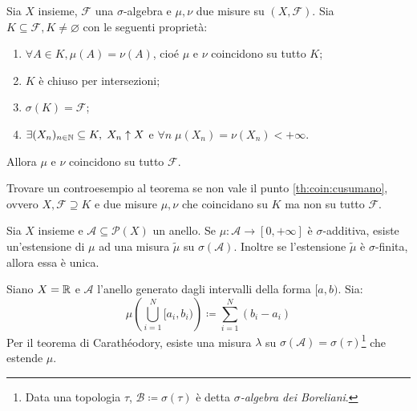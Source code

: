 \begin{thm}
	Sia $X$ insieme, $\mathcal{F}$ una $\sigma$-algebra e $\mu, \nu$ due misure su $(X,\mathcal{F})$. Sia $K\subseteq \mathcal{F}, K\neq \varnothing$ con le seguenti proprietà:
	\begin{enumerate}[label=(\roman*)]
	\item $\forall A \in K, \mu(A)=\nu(A)$, cioé $\mu$ e $\nu$ coincidono su tutto $K$;
	\item $K$ è chiuso per intersezioni;
	\item $\sigma(K)=\mathcal{F}$;
	\item\label{th:coin:cusumano} $\exists (X_n)_{n\in \mathbb{N}}\subseteq K, \; X_n \uparrow X$ e $\forall n\; \mu(X_n)=\nu(X_n)<+\infty$.
	\end{enumerate}
Allora $\mu$ e $\nu$ coincidono su tutto $\mathcal{F}$.
\end{thm}
\begin{exercise}
	Trovare un controesempio al teorema se non vale il punto \ref{th:coin:cusumano}, ovvero $X, \mathcal{F} \supseteq K$ e due misure $\mu,\nu$ che coincidano su $K$ ma non su tutto $\mathcal{F}$.
\end{exercise}
\begin{thm}
	Sia $X$ insieme e $\mathcal{A}\subseteq \mathscr{P}(X)$ un anello. Se $\mu\colon\mathcal{A}\to[0,+\infty]$ è $\sigma$-additiva, esiste un'estensione di $\mu$ ad una misura $\tilde\mu$ su $\sigma(\mathcal{A})$. Inoltre se l'estensione $\tilde\mu$ è $\sigma$-finita, allora essa è unica.
\end{thm}
\begin{example}
	Siano $ X = \mathbb{R} $ e $ \mathcal{A} $ l'anello generato dagli intervalli della forma $[a,b)$. Sia:
	\[ \mu\left( \bigcup_{i=1}^N [a_i,b_i) \right) \coloneqq \sum_{i=1}^N (b_i-a_i) \]
	Per il teorema di Carathéodory, esiste una misura $\lambda$ su $\sigma(\mathcal{A})=\sigma(\tau)$\footnote{Data una topologia $ \tau $, $ \mathcal{B} \coloneqq \sigma(\tau) $ è detta \emph{$ \sigma $-algebra dei Boreliani}.} che estende $\mu$.
\end{example}

